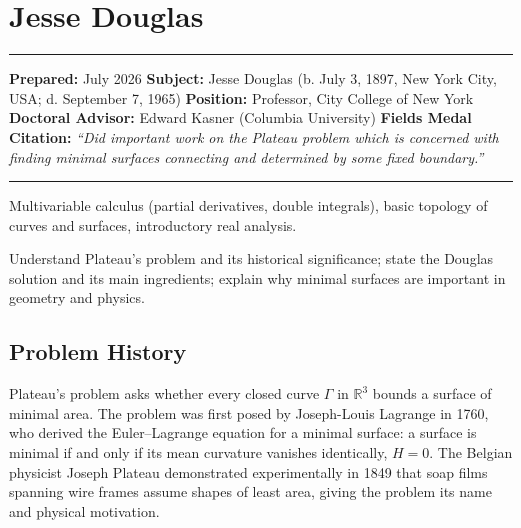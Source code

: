 \chapter{Jesse Douglas}\label{ch1936jessedouglas:jesse-douglas-fields-medal-1936-a-comprehensive-report}

\begin{center}\rule{0.5\linewidth}{0.5pt}\end{center}

\textbf{Prepared:} July 2026 \textbf{Subject:} Jesse Douglas (b. July 3,
1897, New York City, USA; d. September 7, 1965) \textbf{Position:} Professor, City College of
New York \textbf{Doctoral Advisor:} Edward Kasner (Columbia University)
\textbf{Fields Medal Citation:} \emph{``Did important work on the
Plateau problem which is concerned with finding minimal surfaces
connecting and determined by some fixed boundary.''}

\begin{center}\rule{0.5\linewidth}{0.5pt}\end{center}

\begin{prereqs}
Multivariable calculus (partial derivatives, double integrals),
basic topology of curves and surfaces, introductory real analysis.
\end{prereqs}

\begin{objectives}
Understand Plateau's problem and its historical significance; state the
Douglas solution \cite{douglas1931} and its main ingredients; explain why minimal surfaces
are important in geometry and physics.
\end{objectives}

\section{Problem History}

Plateau's problem asks whether every closed curve $\Gamma$ in $\mathbb{R}^3$
bounds a surface of minimal area. The problem was first posed by
Joseph-Louis Lagrange in 1760, who derived the Euler--Lagrange equation
for a minimal surface: a surface is minimal if and only if its mean
curvature vanishes identically, $H = 0$. The Belgian physicist Joseph
Plateau demonstrated experimentally in 1849 that soap films spanning wire
frames assume shapes of least area, giving the problem its name and
physical motivation.

